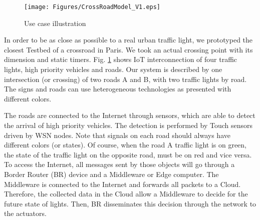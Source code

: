 \begin{figure}[!htb]
\centering
\texttt{[image: Figures/CrossRoadModel\_V1.eps]}
\caption{Use case illustration}
\label{fig:CrossRoadModel.eps}
\end{figure}

In order to be as close as possible to a real urban traffic light, we prototyped the closest Testbed of a crossroad in Paris. We took an actual crossing point with its dimension and static timers. Fig. \ref{fig:CrossRoadModel.eps} shows IoT interconnection of four traffic lights, high priority vehicles and roads.  Our system is described by one intersection (or crossing) of two roads A and B, with two traffic lights by road. The signs and roads can use heterogeneous technologies as presented with different colors. 

The roads are connected to the Internet through sensors, which are able to detect the arrival of high priority vehicles. The detection is performed by Touch sensors driven by WSN nodes. Note that signals on each road should always have different colors (or states). Of course, when the road A traffic light is on green, the state of the traffic light on the opposite road, must be on red and vice versa. To access the Internet, all messages sent by those objects will go through a Border Router (BR) device and a Middleware or Edge computer. The Middleware is connected to the Internet and forwards all packets to a Cloud. Therefore, the collected data in the Cloud allow a Middleware to decide for the future state of lights. Then,  BR disseminates this decision through the network to the actuators.   



%



